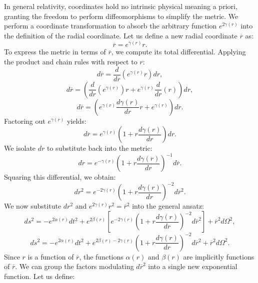 \documentclass[11pt, a4paper]{report}
\begin{document}
In general relativity, coordinates hold no intrinsic physical meaning a priori, granting the freedom to perform diffeomorphisms to simplify the metric. We perform a coordinate transformation to absorb the arbitrary function $e^{2\gamma(r)}$ into the definition of the radial coordinate. Let us define a new radial coordinate $\overline{r}$ as:
\begin{equation}
\overline{r} = e^{\gamma(r)} r.
\end{equation}
To express the metric in terms of $\overline{r}$, we compute its total differential. Applying the product and chain rules with respect to $r$:
\begin{equation}
d\overline{r} = \frac{d}{dr} \left( e^{\gamma(r)} r \right) dr,
\end{equation}
\begin{equation}
d\overline{r} = \left( \frac{d}{dr} \left( e^{\gamma(r)} \right) r + e^{\gamma(r)} \frac{d}{dr} (r) \right) dr,
\end{equation}
\begin{equation}
d\overline{r} = \left( e^{\gamma(r)} \frac{d\gamma(r)}{dr} r + e^{\gamma(r)} \right) dr.
\end{equation}
Factoring out $e^{\gamma(r)}$ yields:
\begin{equation}
d\overline{r} = e^{\gamma(r)} \left( 1 + r \frac{d\gamma(r)}{dr} \right) dr.
\end{equation}
We isolate $dr$ to substitute back into the metric:
\begin{equation}
dr = e^{-\gamma(r)} \left( 1 + r \frac{d\gamma(r)}{dr} \right)^{-1} d\overline{r}.
\end{equation}
Squaring this differential, we obtain:
\begin{equation}
dr^2 = e^{-2\gamma(r)} \left( 1 + r \frac{d\gamma(r)}{dr} \right)^{-2} d\overline{r}^2.
\end{equation}
We now substitute $dr^2$ and $e^{2\gamma(r)} r^2 = \overline{r}^2$ into the general ansatz:
\begin{equation}
ds^2 = -e^{2\alpha(r)} dt^2 + e^{2\beta(r)} \left[ e^{-2\gamma(r)} \left( 1 + r \frac{d\gamma(r)}{dr} \right)^{-2} d\overline{r}^2 \right] + \overline{r}^2 d\Omega^2,
\end{equation}
\begin{equation}
ds^2 = -e^{2\alpha(r)} dt^2 + e^{2\beta(r) - 2\gamma(r)} \left( 1 + r \frac{d\gamma(r)}{dr} \right)^{-2} d\overline{r}^2 + \overline{r}^2 d\Omega^2.
\end{equation}
Since $r$ is a function of $\overline{r}$, the functions $\alpha(r)$ and $\beta(r)$ are implicitly functions of $\overline{r}$. We can group the factors modulating $d\overline{r}^2$ into a single new exponential function. Let us define:
\end{document}
